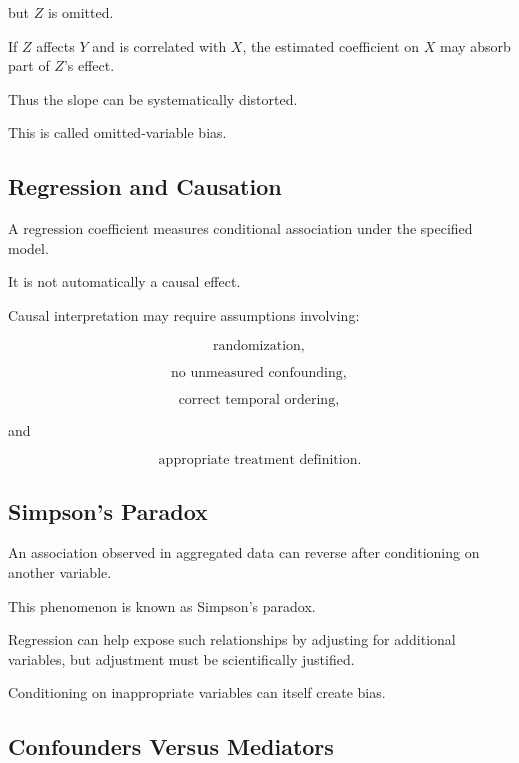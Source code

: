 but \(Z\) is omitted.

If \(Z\) affects \(Y\) and is correlated with \(X\), the estimated
coefficient on \(X\) may absorb part of \(Z\)'s effect.

Thus the slope can be systematically distorted.

This is called omitted-variable bias.

\subsection{Regression and Causation}
\label{subsec:regression-causation}

A regression coefficient measures conditional association under the
specified model.

It is not automatically a causal effect.

Causal interpretation may require assumptions involving:

\[
\boxed{
\text{randomization},
}
\]

\[
\boxed{
\text{no unmeasured confounding},
}
\]

\[
\boxed{
\text{correct temporal ordering},
}
\]

and

\[
\boxed{
\text{appropriate treatment definition}.
}
\]

\subsection{Simpson's Paradox}
\label{subsec:simpsons-paradox-regression}

An association observed in aggregated data can reverse after conditioning
on another variable.

This phenomenon is known as Simpson's paradox.

Regression can help expose such relationships by adjusting for
additional variables, but adjustment must be scientifically justified.

Conditioning on inappropriate variables can itself create bias.

\subsection{Confounders Versus Mediators}
\label{subsec:confounders-mediators}

